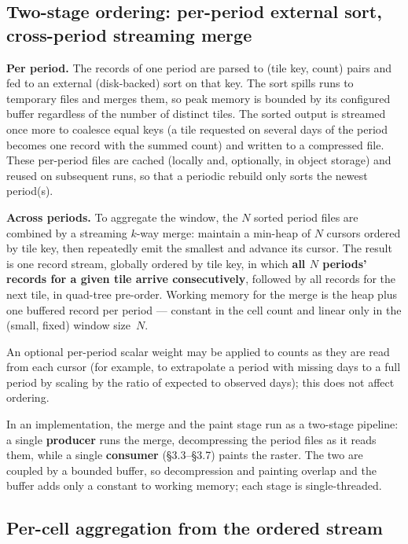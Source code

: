 \documentclass[10pt,twocolumn]{article}
\begin{document}
\subsection{Two-stage ordering: per-period external sort, cross-period
streaming merge}

\textbf{Per period.} The records of one period are parsed to (tile key, count)
pairs and fed to an external (disk-backed) sort on that key. The sort spills
runs to temporary files and merges them, so peak memory is bounded by its
configured buffer regardless of the number of distinct tiles. The sorted
output is streamed once more to coalesce equal keys (a tile requested on
several days of the period becomes one record with the summed count) and
written to a compressed file. These per-period files are
cached (locally and, optionally, in object storage) and reused on subsequent
runs, so that a periodic rebuild only sorts the newest period(s).

\textbf{Across periods.} To aggregate the window, the $N$ sorted period
files are combined by a streaming $k$-way merge: maintain a min-heap of
$N$ cursors ordered by tile key, then repeatedly emit the smallest and
advance its cursor. The result is one record stream, globally ordered by tile
key, in which
\textbf{all $N$ periods' records for a given tile arrive consecutively},
followed by all records for the next tile, in quad-tree pre-order. Working
memory for the merge is the heap plus one buffered record per period ---
constant in the cell count and linear only in the (small, fixed) window
size~$N$.

An optional per-period scalar weight may be applied to counts as they are read
from each cursor (for example, to extrapolate a period with missing days to a
full period by scaling by the ratio of expected to observed days); this does
not affect ordering.

In an implementation, the merge and the paint stage run as a two-stage
pipeline: a single \textbf{producer} runs the merge, decompressing the period
files as it reads them, while a single \textbf{consumer} (\S3.3--\S3.7) paints
the raster. The two are coupled by a bounded buffer, so decompression and
painting overlap and the buffer adds only a constant to working memory; each
stage is single-threaded.

\subsection{Per-cell aggregation from the ordered stream}
\end{document}
